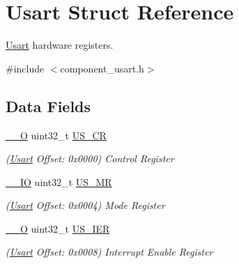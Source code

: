 \hypertarget{structUsart}{}\section{Usart Struct Reference}
\label{structUsart}


\mbox{\hyperlink{structUsart}{Usart}} hardware registers.  




{\ttfamily \#include $<$component\+\_\+usart.\+h$>$}

\subsection*{Data Fields}
\begin{DoxyCompactItemize}
\item 
\mbox{\label{structUsart_a76ed99fe61ef73a9f5e6eee5349bbcc0}} 
\mbox{\hyperlink{core__cm7_8h_a7e25d9380f9ef903923964322e71f2f6}{\+\_\+\+\_\+O}} uint32\+\_\+t \mbox{\hyperlink{structUsart_a76ed99fe61ef73a9f5e6eee5349bbcc0}{U\+S\+\_\+\+CR}}
\begin{DoxyCompactList}\small\item\em (\mbox{\hyperlink{structUsart}{Usart}} Offset\+: 0x0000) Control Register \end{DoxyCompactList}\item 
\mbox{\label{structUsart_a68314d206a9ed9052c3d25e9b2df57d1}} 
\mbox{\hyperlink{core__cm7_8h_aec43007d9998a0a0e01faede4133d6be}{\+\_\+\+\_\+\+IO}} uint32\+\_\+t \mbox{\hyperlink{structUsart_a68314d206a9ed9052c3d25e9b2df57d1}{U\+S\+\_\+\+MR}}
\begin{DoxyCompactList}\small\item\em (\mbox{\hyperlink{structUsart}{Usart}} Offset\+: 0x0004) Mode Register \end{DoxyCompactList}\item 
\mbox{\label{structUsart_a4be2b296e8e8e4f1890bf03dff7cd42b}} 
\mbox{\hyperlink{core__cm7_8h_a7e25d9380f9ef903923964322e71f2f6}{\+\_\+\+\_\+O}} uint32\+\_\+t \mbox{\hyperlink{structUsart_a4be2b296e8e8e4f1890bf03dff7cd42b}{U\+S\+\_\+\+I\+ER}}
\begin{DoxyCompactList}\small\item\em (\mbox{\hyperlink{structUsart}{Usart}} Offset\+: 0x0008) Interrupt Enable Register \end{DoxyCompactList}\item 

\end{DoxyCompactItemize}
